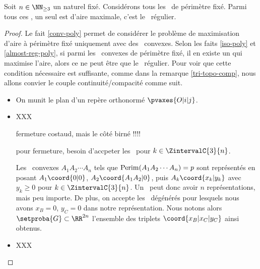%		
%
%
%
%
%
\begin{fact}
	Soit $n \in \NN_{\geq3}$ un naturel fixé.
	Considérons tous les \ngones\  de périmètre fixé. Parmi tous ces \ngones, un seul est d'aire maximale, c'est le \ngone\ régulier.
\end{fact}


\begin{proof}
	Le fait \ref{conv-poly} permet de considérer le problème de maximisation d'aire à périmètre fixé uniquement avec des \ngones\ convexes.
	Selon les faits \ref{iso-poly} et \ref{almost-reg-poly}, si parmi les \ngones\ convexes de périmètre fixé, il en existe un qui maximise l'aire, alors ce ne peut être que le \ngone\ régulier.
	Pour voir que cette condition nécessaire est suffisante, comme dans la remarque \ref{tri-topo-comp}, nous allons convier le couple continuité/compacité comme suit.
	\begin{itemize}
		\item On munit le plan d'un repère orthonormé $\pvaxes{O | i | j}$. 

		\item 
		XXX
		
		fermeture costaud, mais le côté birné !!!!
		
		pour fermeture, besoin d'accpeter les \kgones\ pour $k \in \ZintervalC{3}{n}$.
		
		Les \ngones\ convexes $A_1 A_2 \cdots A_n$ tels que $\mathrm{Perim}(A_1 A_2 \cdots A_n) = p$ sont représentés en posant $A_1\coord{0 | 0}$, $A_2\coord{A_1 A_2 | 0}$, puis $A_k\coord{x_k | y_k}$ avec $y_k \geq 0$ pour $k \in \ZintervalC{3}{n}$. Un \ngone\ peut donc avoir $n$ représentations, mais peu importe.
		De plus, on accepte les \ngones\ dégénérés pour lesquels nous avons $x_B = 0$, $y_C = 0$ dans notre représentation.
		Nous notons alors $\setproba{G} \subset \RR^{2n}$ l'ensemble des triplets $\coord{x_B | x_C | y_C}$ ainsi obtenus.

		\item XXX
		

\end{itemize}
\end{proof}
